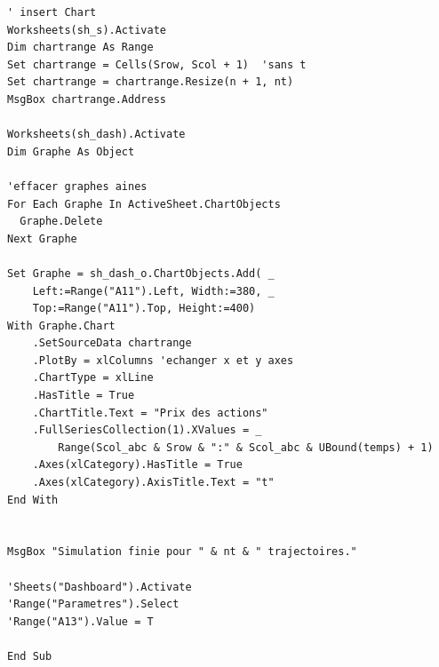 \documentclass[a4paper,12pt]{scrartcl}
\begin{document}
\begin{lstlisting}
' insert Chart
Worksheets(sh_s).Activate
Dim chartrange As Range
Set chartrange = Cells(Srow, Scol + 1)  'sans t
Set chartrange = chartrange.Resize(n + 1, nt)
MsgBox chartrange.Address

Worksheets(sh_dash).Activate
Dim Graphe As Object

'effacer graphes aines
For Each Graphe In ActiveSheet.ChartObjects
  Graphe.Delete
Next Graphe

Set Graphe = sh_dash_o.ChartObjects.Add( _
    Left:=Range("A11").Left, Width:=380, _
    Top:=Range("A11").Top, Height:=400)
With Graphe.Chart
    .SetSourceData chartrange
    .PlotBy = xlColumns 'echanger x et y axes
    .ChartType = xlLine
    .HasTitle = True
    .ChartTitle.Text = "Prix des actions"
    .FullSeriesCollection(1).XValues = _
        Range(Scol_abc & Srow & ":" & Scol_abc & UBound(temps) + 1)
    .Axes(xlCategory).HasTitle = True
    .Axes(xlCategory).AxisTitle.Text = "t"
End With


MsgBox "Simulation finie pour " & nt & " trajectoires."

'Sheets("Dashboard").Activate
'Range("Parametres").Select
'Range("A13").Value = T

End Sub

\end{lstlisting}
\end{document}
